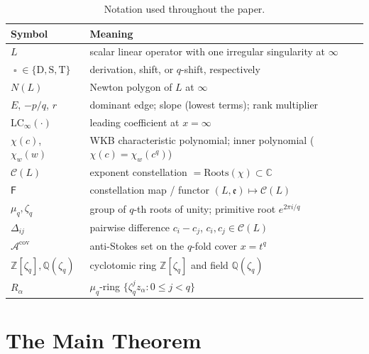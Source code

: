 \documentclass[11pt,a4paper]{article}
\theoremstyle{plain}
\theoremstyle{definition}
\theoremstyle{remark}
\newcommand{\op}{\mathop{\square}}                %
\newcommand{\opD}{\mathrm{D}}                     %
\newcommand{\opS}{\mathrm{S}}                     %
\newcommand{\opT}{\mathrm{T}}                     %
\newcommand{\LCinf}{\mathrm{LC}_\infty}
\newcommand{\Roots}{\mathrm{Roots}}
\newcommand{\NL}{N(L)}
\newcommand{\Cl}{\mathcal{C}}
\newcommand{\Fclass}{\mathsf{F}}
\newcommand{\Acov}{\mathcal{A}^{\mathrm{cov}}}
\newcommand{\Dij}{\Delta_{ij}}
\newcommand{\Zlc}{\mathbb{Z}[\zeta_q]}
\newcommand{\Qlc}{\mathbb{Q}(\zeta_q)}
\begin{document}
\begin{table}[t]
\centering
\small
\begin{tabular}{@{}ll@{}}
\toprule
\textbf{Symbol} & \textbf{Meaning} \\
\midrule
$L$            & scalar linear operator with one irregular singularity at $\infty$ \\
$\op \in \{\opD, \opS, \opT\}$
               & derivation, shift, or $q$-shift, respectively \\
$\NL$          & Newton polygon of $L$ at $\infty$ \\
$E$, $-p/q$, $r$
               & dominant edge; slope (lowest terms); rank multiplier \\
$\LCinf(\cdot)$ & leading coefficient at $x = \infty$ \\
$\chi(c)$, $\chi_w(w)$
               & WKB characteristic polynomial; inner polynomial ($\chi(c) = \chi_w(c^q)$) \\
$\Cl(L)$       & exponent constellation $= \Roots(\chi) \subset \mathbb{C}$ \\
$\Fclass$      & constellation map / functor $(L, \mathfrak{e}) \mapsto \Cl(L)$ \\
$\mu_q, \zeta_q$
               & group of $q$-th roots of unity; primitive root $e^{2\pi i / q}$ \\
$\Dij$         & pairwise difference $c_i - c_j$, $c_i, c_j \in \Cl(L)$ \\
$\Acov$        & anti-Stokes set on the $q$-fold cover $x = t^q$ \\
$\Zlc, \Qlc$   & cyclotomic ring $\mathbb{Z}[\zeta_q]$ and field $\mathbb{Q}(\zeta_q)$ \\
$R_\alpha$     & $\mu_q$-ring $\{\zeta_q^j z_\alpha : 0 \le j < q\}$ \\
\bottomrule
\end{tabular}
\caption{Notation used throughout the paper.}\label{tab:notation}
\end{table}


\section{The Main Theorem}\label{sec:main}
\end{document}
